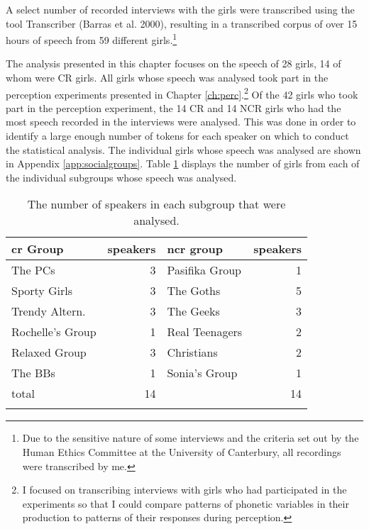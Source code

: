 A select number of recorded interviews with the girls were transcribed using the tool Transcriber (Barras et al. 2000), resulting in a transcribed corpus of over 15 hours of speech from 59 different girls.\footnote{Due to the sensitive nature of some interviews and the criteria set out by the Human Ethics Committee at the University of Canterbury, all recordings were transcribed by me.}  
\nocite{Transcriber-SpeechComm2000}

The analysis presented in this chapter focuses on the speech of 28 girls, 14 of whom were CR girls.  All girls whose speech was analysed took part in the perception experiments presented in Chapter \ref{ch:perc}.\footnote{I focused on transcribing interviews with girls who had participated in the experiments so that I could compare patterns of phonetic variables in their production to patterns of their responses during perception.}  Of the 42 girls who took part in the perception experiment, the 14 CR and 14 NCR girls who had the most speech recorded in the interviews were analysed. This was done in order to identify a large enough number of tokens for each speaker on which to conduct the statistical analysis.   The individual girls whose speech was analysed are shown in Appendix \ref{app:socialgroups}.   Table \ref{tab:groupsprod} displays the number of girls from each of the individual subgroups whose speech was analysed.

\begin{table}[htbp]
\caption{The number of speakers in each subgroup that were analysed.}	
	\label{tab:groupsprod}
	 \begin{center}
		\begin{tabular}{lrlr}
		\lsptoprule
		\sc cr Group & \sc speakers & \sc ncr group & \sc speakers \\
  \midrule
The PCs & 3      &Pasifika Group & 1  \\
Sporty Girls & 3  &The Goths & 5 \\
Trendy Altern. & 3  &The Geeks & 3  \\
Rochelle's Group & 1   &Real Teenagers & 2 \\
Relaxed Group & 3      &Christians & 2 \\
The BBs & 1        &Sonia's Group & 1  \\\midrule
\sc total & 14  & & 14  \\

\lspbottomrule
		\end{tabular}
	
	\end{center}
\end{table} 


